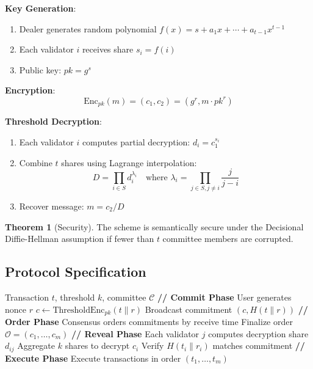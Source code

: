 \documentclass[11pt,a4paper]{article}
\theoremstyle{definition}
\newtheorem{theorem}{Theorem}
\begin{document}
\textbf{Key Generation}:
\begin{enumerate}
    \item Dealer generates random polynomial $f(x) = s + a_1 x + \cdots + a_{t-1} x^{t-1}$
    \item Each validator $i$ receives share $s_i = f(i)$
    \item Public key: $pk = g^s$
\end{enumerate}

\textbf{Encryption}:
\[
\text{Enc}_{pk}(m) = (c_1, c_2) = (g^r, m \cdot pk^r)
\]

\textbf{Threshold Decryption}:
\begin{enumerate}
    \item Each validator $i$ computes partial decryption: $d_i = c_1^{s_i}$
    \item Combine $t$ shares using Lagrange interpolation:
    \[
    D = \prod_{i \in S} d_i^{\lambda_i} \quad \text{where } \lambda_i = \prod_{j \in S, j \neq i} \frac{j}{j-i}
    \]
    \item Recover message: $m = c_2 / D$
\end{enumerate}

\begin{theorem}[Security]
The scheme is semantically secure under the Decisional Diffie-Hellman assumption if fewer than $t$ committee members are corrupted.
\end{theorem}

\subsection{Protocol Specification}

\begin{algorithm}
\caption{Threshold Commit-Reveal MEV Protection}
\begin{algorithmic}[1]
\Require Transaction $t$, threshold $k$, committee $\mathcal{C}$
\Statex
\State \textbf{// Commit Phase}
\State User generates nonce $r$
\State $c \gets \text{ThresholdEnc}_{pk}(t \| r)$
\State Broadcast commitment $(c, H(t \| r))$
\Statex
\State \textbf{// Order Phase}
\State Consensus orders commitments by receive time
\State Finalize order $\mathcal{O} = (c_1, \ldots, c_m)$
\Statex
\State \textbf{// Reveal Phase}
    \State Each validator $j$ computes decryption share $d_{ij}$
    \State Aggregate $k$ shares to decrypt $c_i$
    \State Verify $H(t_i \| r_i)$ matches commitment
\EndFor
\Statex
\State \textbf{// Execute Phase}
\State Execute transactions in order $(t_1, \ldots, t_m)$
\end{algorithmic}
\end{algorithm}
\end{document}

